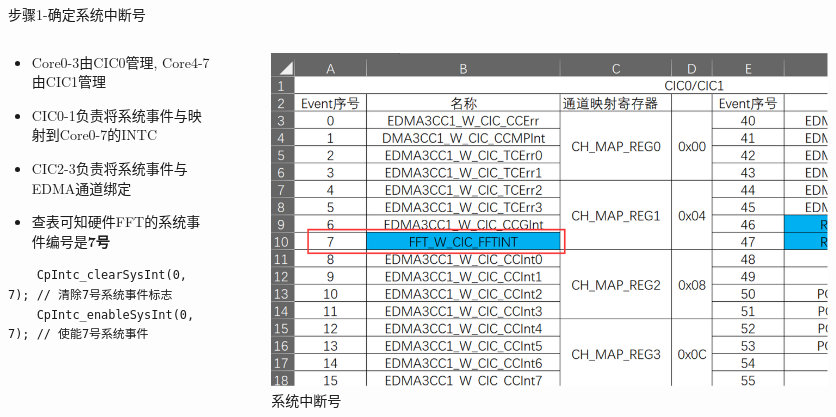 \documentclass[10pt]{ctexbeamer}
\begin{document}
    \begin{frame}[fragile]{步骤1-确定系统中断号}
        \begin{columns}
            \begin{column}{0.5\textwidth}
                \begin{itemize}
                    \setlength{\itemsep}{0.3cm}
                    \item Core0-3由CIC0管理, Core4-7由CIC1管理
                    \item CIC0-1负责将系统事件与映射到Core0-7的INTC
                    \item CIC2-3负责将系统事件与EDMA通道绑定
                    \item 查表可知硬件FFT的系统事件编号是\textbf{7号}
                \end{itemize}
\vspace{0.5cm}

                \scriptsize
                \begin{verbatim}
    CpIntc_clearSysInt(0, 7); // 清除7号系统事件标志
    CpIntc_enableSysInt(0, 7); // 使能7号系统事件
                \end{verbatim}

            \end{column}
            \begin{column}{0.5\textwidth}
                \begin{figure}
                    \centering
                    \includegraphics[width=\textwidth]{summary/3.eps}
                    \caption{系统中断号}
                \end{figure}
            \end{column}
        \end{columns}
    \end{frame}
\end{document}
